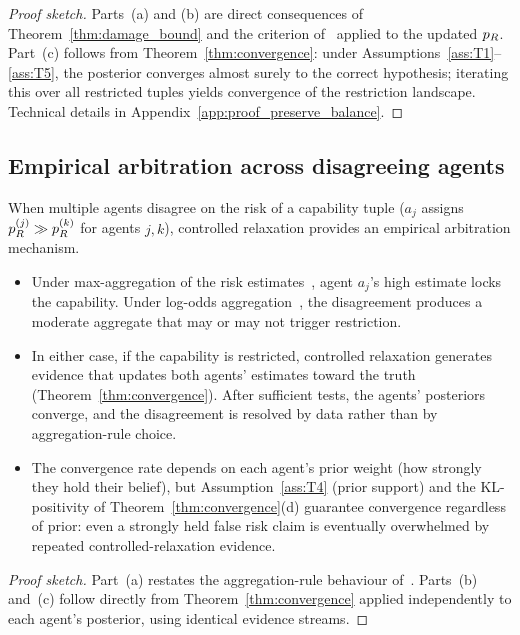 \begin{proof}[Proof sketch]
Parts~(a) and (b) are direct consequences of
Theorem~\ref{thm:damage_bound} and the criterion
of~\citep[Proposition~1]{lasser2026horizon} applied to the
updated $p_R$.  Part~(c) follows from
Theorem~\ref{thm:convergence}: under
Assumptions~\ref{ass:T1}--\ref{ass:T5}, the posterior converges
almost surely to the correct hypothesis; iterating this over
all restricted tuples yields convergence of the restriction
landscape.  Technical details in
Appendix~\ref{app:proof_preserve_balance}.
\end{proof}

\subsection{Empirical arbitration across disagreeing agents}

\begin{proposition}
\label{prop:empirical_arbitration}
When multiple agents disagree on the risk of a capability tuple
($a_j$ assigns $p_R^{(j)} \gg p_R^{(k)}$ for agents $j, k$),
controlled relaxation provides an empirical arbitration
mechanism.
\begin{itemize}
\item[(a)] Under max-aggregation of the risk
  estimates~\citep{lasser2026horizon}, agent $a_j$'s high
  estimate locks the capability.  Under log-odds
  aggregation~\citep[Definition~5]{lasser2026scm}, the
  disagreement produces a moderate aggregate that may or may
  not trigger restriction.
\item[(b)] In either case, if the capability is restricted,
  controlled relaxation generates evidence that updates both
  agents' estimates toward the truth
  (Theorem~\ref{thm:convergence}).  After sufficient tests, the
  agents' posteriors converge, and the disagreement is resolved
  by data rather than by aggregation-rule choice.
\item[(c)] The convergence rate depends on each agent's prior
  weight (how strongly they hold their belief), but
  Assumption~\ref{ass:T4} (prior support) and the KL-positivity
  of Theorem~\ref{thm:convergence}(d) guarantee convergence
  regardless of prior: even a strongly held false risk claim is
  eventually overwhelmed by repeated controlled-relaxation
  evidence.
\end{itemize}
\end{proposition}

\begin{proof}[Proof sketch]
Part~(a) restates the aggregation-rule behaviour
of~\citep{lasser2026horizon, lasser2026scm}.  Parts~(b)
and~(c) follow directly from Theorem~\ref{thm:convergence}
applied independently to each agent's posterior, using
identical evidence streams.
\end{proof}

